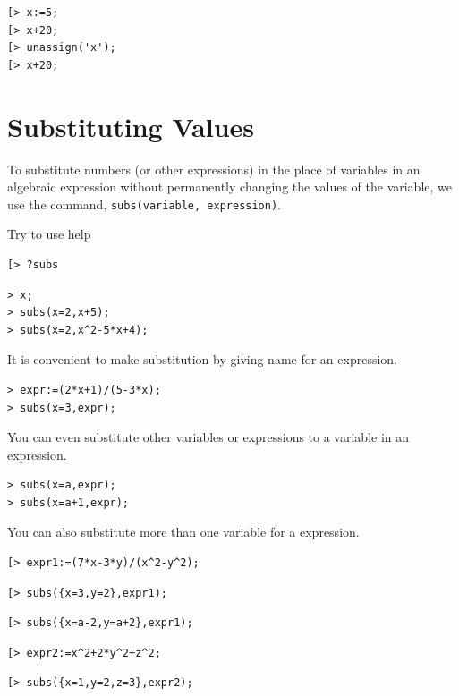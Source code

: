 \documentclass[
]{book}
\theoremstyle{definition}
\theoremstyle{definition}
\theoremstyle{definition}
\theoremstyle{definition}
\theoremstyle{remark}
\begin{document}
\begin{verbatim}
[> x:=5;
[> x+20;
[> unassign('x');
[> x+20;
\end{verbatim}

\section{Substituting Values}\label{substituting-values}

To substitute numbers (or other expressions) in the place of variables in an algebraic expression without permanently changing the values of the variable, we use the command,
\texttt{subs(variable,\ expression)}.

Try to use help

\begin{verbatim}
[> ?subs
\end{verbatim}

\begin{verbatim}
> x;
> subs(x=2,x+5);
> subs(x=2,x^2-5*x+4);
\end{verbatim}

It is convenient to make substitution by giving name for an expression.

\begin{verbatim}
> expr:=(2*x+1)/(5-3*x);
> subs(x=3,expr);
\end{verbatim}

You can even substitute other variables or expressions to a variable in an expression.

\begin{verbatim}
> subs(x=a,expr);
> subs(x=a+1,expr);
\end{verbatim}

You can also substitute more than one variable for a expression.

\begin{verbatim}
[> expr1:=(7*x-3*y)/(x^2-y^2);
\end{verbatim}

\begin{verbatim}
[> subs({x=3,y=2},expr1);
\end{verbatim}

\begin{verbatim}
[> subs({x=a-2,y=a+2},expr1);
\end{verbatim}

\begin{verbatim}
[> expr2:=x^2+2*y^2+z^2;
\end{verbatim}

\begin{verbatim}
[> subs({x=1,y=2,z=3},expr2);
\end{verbatim}
\end{document}

